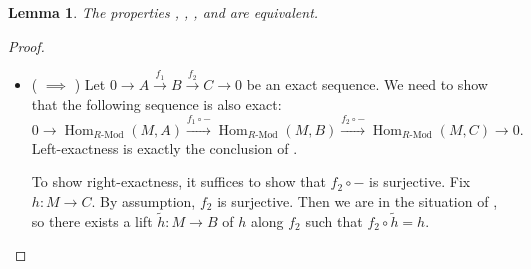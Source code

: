 \documentclass[11pt]{article}
\newcommand{\Hom}{\operatorname{Hom}}
\newcommand{\RHom}[3]{\Hom_{{#1}\text{-Mod}}({#2}, {#3})}
\newcommand{\wt}{\widetilde}
\theoremstyle{plain}
\newtheorem{lemma}{Lemma}[section]
\theoremstyle{definition}
\begin{document}
\begin{lemma}\label{lemma:projective-equivalent}
  The properties , , , and  are equivalent.
\end{lemma}
\begin{proof}
  \begin{itemize}
  \item ( \(\implies\) )
    Let \(0 \to A \overset{f_1}{\to} B \overset{f_2}{\to} C \to 0\) be an exact sequence. We need to show that the following sequence is also exact:
    \[0 \to \RHom{R}{M}{A} \overset{f_1 \circ -}{\to} \RHom{R}{M}{B} \overset{f_2 \circ -}{\to} \RHom{R}{M}{C} \to 0.\]
    Left-exactness is exactly the conclusion of .

    To show right-exactness, it suffices to show that \(f_2 \circ -\) is surjective. Fix \(h : M \to C\). By assumption, \(f_2\) is surjective. Then we are in the situation of , so there exists a lift \(\wt{h} : M \to B\) of \(h\) along \(f_2\) such that \(f_2 \circ \wt{h} = h\).


\end{itemize}
\end{proof}
\end{document}
